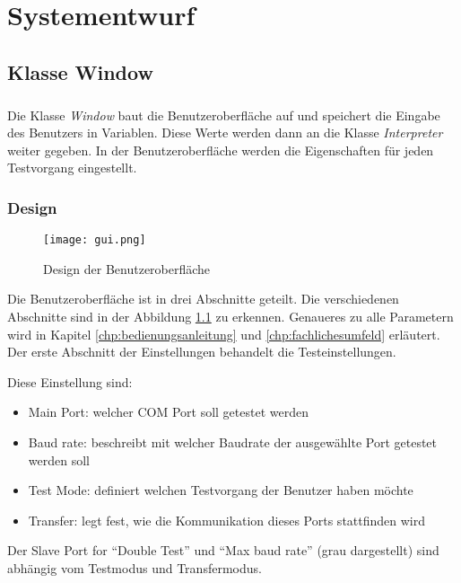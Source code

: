\chapter{Systementwurf}\label{chp:systementwurf}


\section{Klasse Window}
\paragraph{}
Die Klasse \textit{Window} baut die Benutzeroberfläche auf und speichert die Eingabe des Benutzers in Variablen. Diese Werte werden dann an die Klasse \textit{Interpreter} weiter gegeben. In der Benutzeroberfläche werden die Eigenschaften für jeden Testvorgang eingestellt.


\subsection{Design}
\begin{figure}[h]
  \begin{center}
    \texttt{[image: gui.png]}
  		  \caption{Design der Benutzeroberfläche}
     \label{GUI_Bild}
  \end{center}
\end{figure}


Die Benutzeroberfläche ist in drei Abschnitte geteilt. Die verschiedenen Abschnitte sind in der Abbildung \ref{GUI_Bild} zu erkennen. Genaueres zu alle Parametern wird in Kapitel \ref{chp:bedienungsanleitung} und  \ref{chp:fachlichesumfeld} erläutert. Der erste Abschnitt der Einstellungen behandelt die Testeinstellungen. 

\newpage

Diese Einstellung sind:
\begin{itemize}
\item Main Port: welcher COM Port soll getestet werden
\item Baud rate: beschreibt mit welcher Baudrate der ausgewählte Port getestet werden soll
\item Test Mode: definiert welchen Testvorgang der Benutzer haben möchte
\item Transfer: legt fest, wie die Kommunikation dieses Ports stattfinden wird
\end{itemize}

Der Slave Port for "`Double Test"' und "`Max baud rate"' (grau dargestellt) sind abhängig vom Testmodus und Transfermodus.\\

